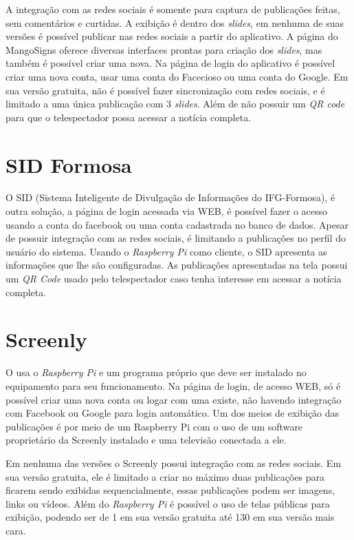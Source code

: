 A integração com as redes sociais é somente para captura de publicações feitas, sem comentários e curtidas. A exibição é dentro dos \textit{slides}, em nenhuma de suas versões é possível publicar nas redes sociais a partir do aplicativo. A página do MangoSigns oferece diversas interfaces prontas para criação dos \textit{slides}, mas também é possível criar uma nova. Na página de login do aplicativo é possível criar uma nova conta, usar uma conta do Facecioso ou uma conta do Google. Em sua versão gratuita, não é possível fazer sincronização com redes sociais, e é limitado a uma única publicação com 3 \textit{slides}. Além de não possuir um \textit{QR code} para que o telespectador possa acessar a notícia completa.

\section{SID Formosa}
O SID (Sistema Inteligente de Divulgação de Informações do IFG-Formosa), é outra solução, a página de login acessada via WEB, é possível fazer o acesso usando a conta do facebook ou uma conta cadastrada no banco de dados. Apesar de possuir integração com as redes sociais, é limitando a publicações no perfil do usuário do sistema. Usando o \textit{Raspberry Pi} como cliente, o SID apresenta as informações que lhe são configuradas. As publicações apresentadas na tela possui um \textit{QR Code} usado pelo telespectador caso tenha interesse em acessar a notícia completa. \cite{sobrinho2017}

\section{Screenly}
O \cite{screenly2017} usa o \textit{Raspberry Pi} e um programa próprio que deve ser instalado no equipamento para seu funcionamento. Na página de login, de acesso WEB, só é possível criar uma nova conta ou logar com uma existe, não havendo integração com Facebook ou Google para login automático. Um dos meios de exibição das publicações é por meio de um Raspberry Pi com o uso de um software proprietário da Screenly instalado e uma televisão conectada a ele. 

Em nenhuma das versões o Screenly possui integração com as redes sociais. Em sua versão gratuita, ele é limitado a criar no máximo duas publicações para ficarem sendo exibidas sequencialmente, essas publicações podem ser imagens, links ou vídeos. Além do \textit{Raspberry Pi} é possível o uso de telas públicas para exibição, podendo ser de 1 em sua versão gratuita até 130 em sua versão mais cara.

